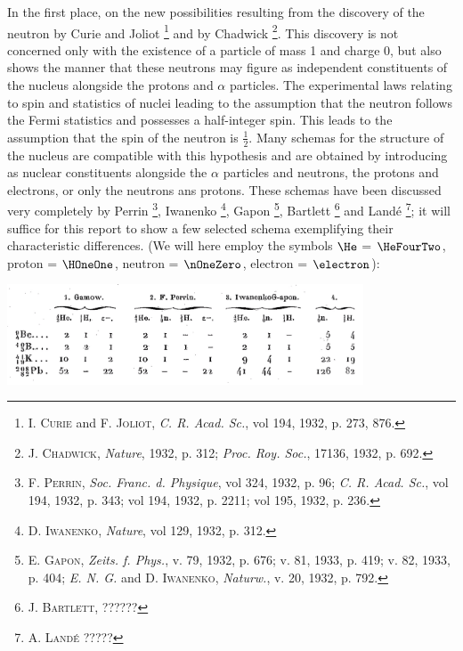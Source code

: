 \documentclass{article}
\begin{document}
In the first place, on the new possibilities resulting from the discovery of the neutron by Curie and Joliot \footnote{\textsc{I. Curie} and \textsc{F. Joliot}, \textit{C. R. Acad. Sc.}, vol 194, 1932, p. 273, 876.} and by Chadwick \footnote{\textsc{J. Chadwick}, \textit{Nature}, 1932, p. 312; \textit{Proc. Roy. Soc.}, 17136, 1932, p. 692.}. This discovery is not concerned only with the existence of a particle of mass 1 and charge 0, but also shows the manner that these neutrons may figure as independent constituents of the nucleus alongside the protons and $\alpha$ particles. The experimental laws relating to spin and statistics of nuclei leading to the assumption that the neutron follows the Fermi statistics and possesses a half-integer spin. This leads to the assumption that the spin of the neutron is $\frac{1}{2}$.
Many schemas for the structure of the nucleus are compatible with this hypothesis and are obtained by introducing as nuclear constituents alongside the $\alpha$ particles and neutrons, the protons and electrons, or only the neutrons ans protons. These schemas have been discussed very completely by Perrin \footnote{\textsc{F. Perrin}, \textit{Soc. Franc. d. Physique}, vol 324, 1932, p. 96; \textit{C. R. Acad. Sc.}, vol 194, 1932, p. 343; vol 194, 1932, p. 2211; vol 195, 1932, p. 236.}, Iwanenko \footnote{\textsc{D. Iwanenko}, \textit{Nature}, vol 129, 1932, p. 312.}, Gapon \footnote{\textsc{E. Gapon}, \textit{Zeits. f. Phys.}, v. 79, 1932, p. 676; v. 81, 1933, p. 419; v. 82, 1933, p. 404; \textit{E. N. G.} and \textsc{D. Iwanenko}, \textit{Naturw.}, v. 20, 1932, p. 792.}, Bartlett \footnote{\textsc{J. Bartlett}, ??????} and Landé \footnote{\textsc{A. Landé} ?????}; it will suffice for this report to show a few selected schema exemplifying their characteristic differences. (We will here employ the symbols $\He$ = $\HeFourTwo$, proton = $\HOneOne$, neutron = $\nOneZero$, electron = $\electron$):

\begin{table}[h!]
\centering
\includegraphics[width=300pt]{images/table1}
\end{table}
\end{document}
